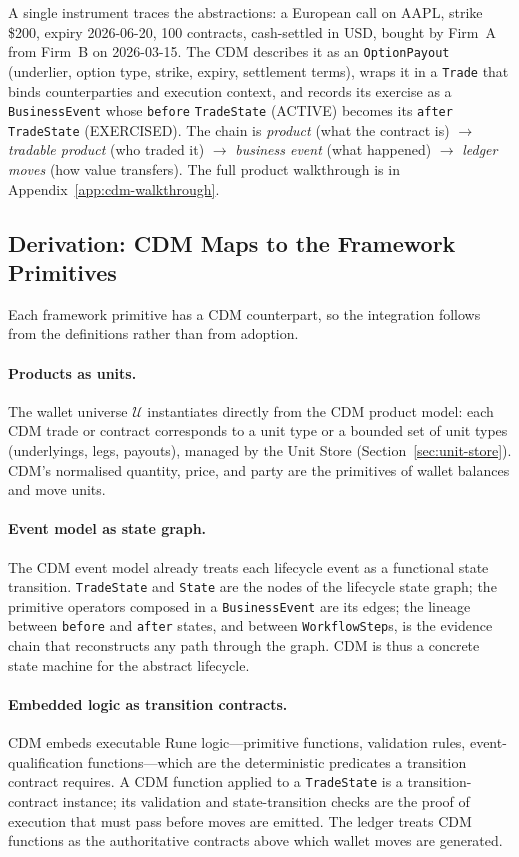 \documentclass[11pt,a4paper]{article}
\begin{document}
A single instrument traces the abstractions: a European call on AAPL, strike \$200, expiry 2026-06-20, 100 contracts, cash-settled in USD, bought by Firm~A from Firm~B on 2026-03-15. The CDM describes it as an \texttt{OptionPayout} (underlier, option type, strike, expiry, settlement terms), wraps it in a \texttt{Trade} that binds counterparties and execution context, and records its exercise as a \texttt{BusinessEvent} whose \texttt{before} \texttt{TradeState} (ACTIVE) becomes its \texttt{after} \texttt{TradeState} (EXERCISED). The chain is \emph{product} (what the contract is) $\to$ \emph{tradable product} (who traded it) $\to$ \emph{business event} (what happened) $\to$ \emph{ledger moves} (how value transfers). The full product walkthrough is in Appendix~\ref{app:cdm-walkthrough}.

\subsection{Derivation: CDM Maps to the Framework Primitives}

Each framework primitive has a CDM counterpart, so the integration follows from the definitions rather than from adoption.

\paragraph{Products as units.} The wallet universe $\mathcal{U}$ instantiates directly from the CDM product model: each CDM trade or contract corresponds to a unit type or a bounded set of unit types (underlyings, legs, payouts), managed by the Unit Store (Section~\ref{sec:unit-store}). CDM's normalised quantity, price, and party are the primitives of wallet balances and move units.

\paragraph{Event model as state graph.} The CDM event model already treats each lifecycle event as a functional state transition. \texttt{TradeState} and \texttt{State} are the nodes of the lifecycle state graph; the primitive operators composed in a \texttt{BusinessEvent} are its edges; the lineage between \texttt{before} and \texttt{after} states, and between \texttt{WorkflowStep}s, is the evidence chain that reconstructs any path through the graph. CDM is thus a concrete state machine for the abstract lifecycle.

\paragraph{Embedded logic as transition contracts.} CDM embeds executable Rune logic---primitive functions, validation rules, event-qualification functions---which are the deterministic predicates a transition contract requires. A CDM function applied to a \texttt{TradeState} is a transition-contract instance; its validation and state-transition checks are the proof of execution that must pass before moves are emitted. The ledger treats CDM functions as the authoritative contracts above which wallet moves are generated.
\end{document}
